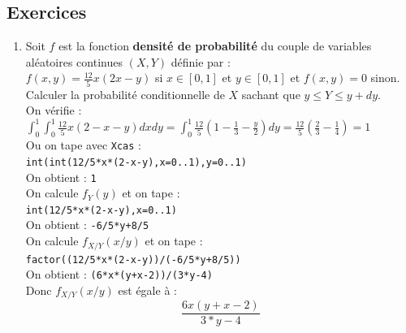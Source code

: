 \documentclass[a4paper,11pt]{book}
\begin{document}
\subsection{Exercices}
\begin{enumerate}
\item Soit  $f$ est la fonction {\bf densit\'e de probabilit\'e} du couple de 
variables al\'eatoires continues $(X,Y)$ d\'efinie par :\\
$\displaystyle f(x,y)=\frac{12}{5}x(2x-y)$ si $x\in [0,1]$ et $y\in [0,1]$ et
$f(x,y)=0$ sinon.\\
Calculer la probabilit\'e conditionnelle de $X$ sachant que $y\leq Y\leq y+dy$.\\

On v\'erifie :\\
$\displaystyle \int_0^1\int_0^1\frac{12}{5}x(2-x-y)dxdy=\int_0^1\frac{12}{5}(1-\frac{1}{3}-\frac{y}{2})dy=\frac{12}{5}(\frac{2}{3}-\frac{1}{4})=1$\\
Ou on tape avec {\tt Xcas} :\\
{\tt int(int(12/5*x*(2-x-y),x=0..1),y=0..1)}\\
On obtient : {\tt 1}\\
On calcule $f_Y(y)$ et on tape :\\
{\tt int(12/5*x*(2-x-y),x=0..1)}\\
On obtient : {\tt -6/5*y+8/5}\\
On calcule $f_{X/Y}(x/y)$ et on tape :\\
{\tt factor((12/5*x*(2-x-y))/(-6/5*y+8/5))}\\
On obtient : {\tt (6*x*(y+x-2))/(3*y-4)}\\
Donc $f_{X/Y}(x/y) $ est \'egale \`a : 
$$\frac{6x(y+x-2)}{3*y-4}$$


\end{enumerate}
\end{document}
